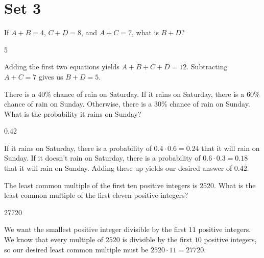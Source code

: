 \documentclass[11pt]{article}
\begin{document}
\newpage
\section*{Set 3}
\begin{problem}
If $A+B=4$, $C+D=8$, and $A+C=7$, what is $B+D$?
\end{problem}

\begin{answer}
5
\end{answer}

\begin{solution}
Adding the first two equations yields $A+B+C+D=12$. Subtracting $A+C=7$ gives us $B+D=\boxed{5}$.
\end{solution}


\begin{problem}
There is a 40\% chance of rain on Saturday. If it rains on Saturday, there is a 60\% chance of rain on Sunday. Otherwise, there is a 30\% chance of rain on Sunday. What is the probability it rains on Sunday?
\end{problem}

\begin{answer}
0.42
\end{answer}

\begin{solution}
If it rains on Saturday, there is a probability of $0.4 \cdot 0.6 =  0.24$ that it will rain on Sunday. If it doesn't rain on Saturday, there is a probability of $0.6 \cdot 0.3 = 0.18$ that it will rain on Sunday. Adding these up yields our desired answer of $\boxed{0.42}$.
\end{solution}


\begin{problem}
The least common multiple of the first ten positive integers is $2520$. What is the least common multiple of the first eleven positive integers?
\end{problem}

\begin{answer}
27720
\end{answer}

\begin{solution}
We want the smallest positive integer divisible by the first $11$ positive integers. We know that every multiple of $2520$ is divisible by the first $10$ positive integers, so our desired least common multiple must be $2520 \cdot 11 = \boxed{27720}$.
\end{solution}
\end{document}
